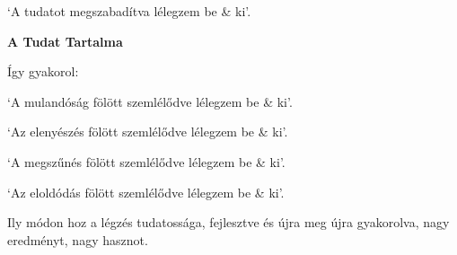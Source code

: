 {`A tudatot megszabadítva lélegzem be \& ki'.

\textbf{A Tudat Tartalma}

Így gyakorol:

`A mulandóság fölött szemlélődve lélegzem be \& ki'.

`Az elenyészés fölött szemlélődve lélegzem be \& ki'.

`A megszűnés fölött szemlélődve lélegzem be \& ki'.

`Az eloldódás fölött szemlélődve lélegzem be \& ki'.

\bigskip

Ily módon hoz a légzés tudatossága, fejlesztve és újra meg újra gyakorolva, nagy eredményt, nagy hasznot.

}

